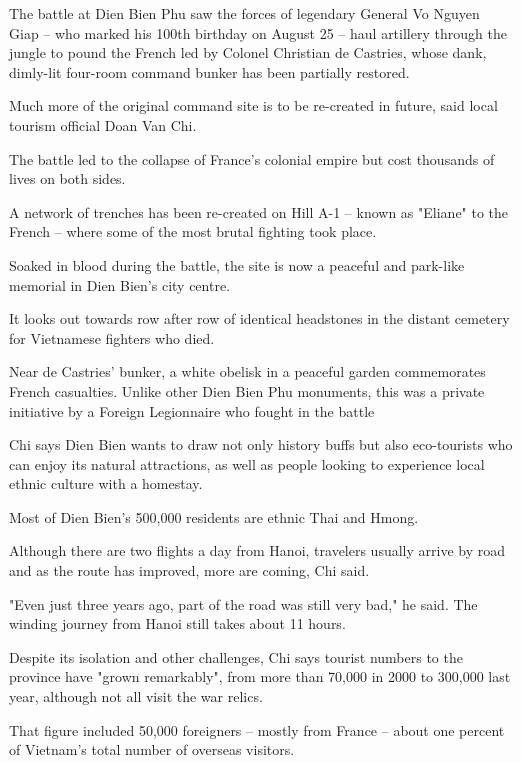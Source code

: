 \documentclass{article}
\begin{document}
\begin{multicols}{3}
The battle at Dien Bien Phu saw the forces of legendary General Vo Nguyen Giap -- who marked his 100th birthday on August 25 -- haul artillery through the jungle to pound the French led by Colonel Christian de Castries, whose dank, dimly-lit four-room command bunker has been partially restored.

Much more of the original command site is to be re-created in future, said local tourism official Doan Van Chi.

The battle led to the collapse of France's colonial empire but cost thousands of lives on both sides.

A network of trenches has been re-created on Hill A-1 -- known as "Eliane" to the French -- where some of the most brutal fighting took place.

Soaked in blood during the battle, the site is now a peaceful and park-like memorial in Dien Bien's city centre.

It looks out towards row after row of identical headstones in the distant cemetery for Vietnamese fighters who died.

Near de Castries' bunker, a white obelisk in a peaceful garden commemorates French casualties. Unlike other Dien Bien Phu monuments, this was a private initiative by a Foreign Legionnaire who fought in the battle

Chi says Dien Bien wants to draw not only history buffs but also eco-tourists who can enjoy its natural attractions, as well as people looking to experience local ethnic culture with a homestay.

Most of Dien Bien's 500,000 residents are ethnic Thai and Hmong.

Although there are two flights a day from Hanoi, travelers usually arrive by road and as the route has improved, more are coming, Chi said.

"Even just three years ago, part of the road was still very bad," he said. The winding journey from Hanoi still takes about 11 hours.

Despite its isolation and other challenges, Chi says tourist numbers to the province have "grown remarkably", from more than 70,000 in 2000 to 300,000 last year, although not all visit the war relics.

That figure included 50,000 foreigners -- mostly from France -- about one percent of Vietnam's total number of overseas visitors.
\end{multicols}
\end{document}
